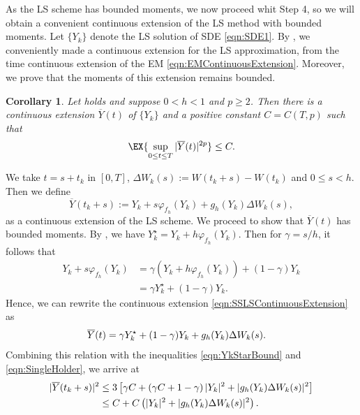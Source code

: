\documentclass[sort&compress, preprint]{elsarticle}
\theoremstyle{definition}
\theoremstyle{plain}%
\newtheorem{corollary}{Corollary}[section]
\theoremstyle{remark}
\newcommand{\SM}{LS\xspace}
\begin{document}
	As the \SM scheme has bounded moments, we now proceed whit Step 4, so we will obtain a convenient 
continuous extension of the \SM method with bounded moments. 
Let $\{Y_k\}$ denote the \SM solution of SDE \eqref{eqn:SDE1}.
By , we conveniently made a continuous extension for the \SM approximation, from the 
time continuous extension of the EM \eqref{eqn:EMContinuousExtension}.
Moreover, we prove that the  moments of this extension remains bounded.
\begin{corollary}\label{col:ContinuousExtBoundedMoments}
	Let  holds and suppose  $0<h<1$ and $p\geq 
	2$. Then there is a continuous extension $\overline{Y}(t)$ of $\{Y_k\}$  and a positive constant $C=C(T,p)$ such 
	that
	\begin{equation*}
		\EX{\sup_{0\leq t \leq T} |\overline{Y}(t)|^{2p} }
		\leq C.
	\end{equation*}
\end{corollary}
	\begin{pf}
		We take $t=s+t_k$ in $ [0,T]$, $\Delta W_k(s):= W(t_k+s)- W(t_k)$ and $0\leq s <h$.
		Then we define 
		\begin{equation}\label{eqn:SSLSContinuousExtension}
			\overline{Y}(t_k+s):= Y_k + s \varphi_{f_h}(Y_k) + g_h(Y_k)\Delta W_k(s),
		\end{equation}
		as a continuous extension of the \SM scheme. We proceed to show that $\overline{Y}(t)$ has bounded moments.
		By , we have $Y_k^{\star}= Y_k + h \varphi_{f_h}(Y_k)$. 
		Then for $\gamma = s/h$, it follows that
		\begin{align*}
			Y_k + s \varphi_{f_h}(Y_k)
			&= 
			\gamma (Y_k + h \varphi_{f_h}(Y_k)) +(1-\gamma)Y_k\\
			&=
			\gamma Y_k^{\star} + (1-\gamma)Y_k.
		\end{align*}
		Hence, we can rewrite the continuous extension \eqref{eqn:SSLSContinuousExtension} as
		\begin{align}
			\overline{Y}(t) &=
			\gamma Y^{\star}_k + (1-\gamma) Y_k +g_h(Y_k) \Delta W_k(s). %
			\notag
		\end{align}
		Combining this relation with  the inequalities \eqref{eqn:YkStarBound} and \eqref{eqn:SingleHolder}, we arrive 
		at
		\begin{align}
			|\overline{Y}(t_k+s) |^2 
			&\leq
				3\left[
					\gamma C
					+
					\left(
						\gamma C +1 - \gamma
					\right)
					|Y_k|^2
					+
					|g_h(Y_k)\Delta W_k(s)|^2
			\right] \notag\\
		&\leq
			C
			+
			C
			\left(
				|Y_k|^2 + |g_h(Y_k)\Delta W_k(s)|^2
			\right).
		\notag
		\end{align}
	\end{pf}
\end{document}
